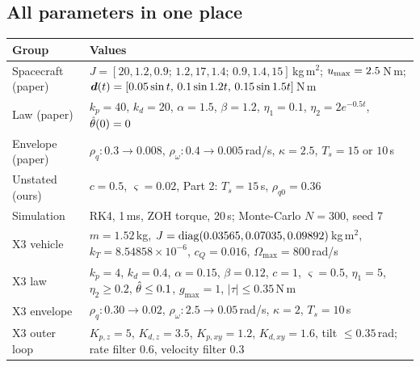 \subsection{All parameters in one place}

\begin{center}\small
\begin{tabularx}{\linewidth}{@{}l X@{}}
\toprule
\textbf{Group} & \textbf{Values}\\
\midrule
Spacecraft (paper) & $J=[20,1.2,0.9;\,1.2,17,1.4;\,0.9,1.4,15]$\,kg\,m$^2$; $u_{\max}=2.5$\,N\,m; $\bm{d}(t)=[0.05\sin t,\,0.1\sin1.2t,\,0.15\sin1.5t]$\,N\,m\\
Law (paper) & $k_p=40$, $k_d=20$, $\alpha=1.5$, $\beta=1.2$, $\eta_1=0.1$, $\eta_2=2e^{-0.5t}$, $\hat{\theta}(0)=0$\\
Envelope (paper) & $\rho_q:0.3\to0.008$, $\rho_\omega:0.4\to0.005$\,rad/s, $\kappa=2.5$, $T_s=15$ or $10$\,s\\
Unstated (ours) & $c=0.5$, $\varsigma=0.02$, Part 2: $T_s=15$\,s, $\rho_{q0}=0.36$\\
Simulation & RK4, 1\,ms, ZOH torque, 20\,s; Monte-Carlo $N=300$, seed 7\\
X3 vehicle & $m=1.52$\,kg, $J=\operatorname{diag}(0.03565,0.07035,0.09892)$\,kg\,m$^2$, $k_T=8.54858\times10^{-6}$, $c_Q=0.016$, $\Omega_{\max}=800$\,rad/s\\
X3 law & $k_p=4$, $k_d=0.4$, $\alpha=0.15$, $\beta=0.12$, $c=1$, $\varsigma=0.5$, $\eta_1=5$, $\eta_2\ge0.2$, $\hat{\theta}\le0.1$, $g_{\max}=1$, $|\tau|\le0.35$\,N\,m\\
X3 envelope & $\rho_q:0.30\to0.02$, $\rho_\omega:2.5\to0.05$\,rad/s, $\kappa=2$, $T_s=10$\,s\\
X3 outer loop & $K_{p,z}=5$, $K_{d,z}=3.5$, $K_{p,xy}=1.2$, $K_{d,xy}=1.6$, tilt $\le0.35$\,rad; rate filter 0.6, velocity filter 0.3\\
\bottomrule
\end{tabularx}
\end{center}

